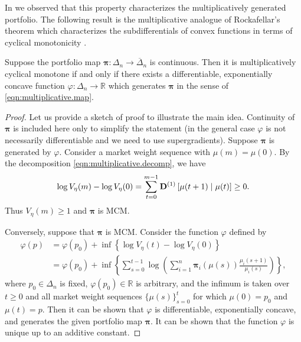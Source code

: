 \documentclass[graybox]{svmult}
\begin{document}
In \cite{PW15} we observed that this property characterizes the multiplicatively generated portfolio. The following result is the multiplicative analogue of Rockafellar's theorem which characterizes the subdifferentials of convex functions in terms of cyclical monotonicity \cite[Section 24]{R70}.

\begin{theorem}
Suppose the portfolio map $\boldsymbol{\pi}: \Delta_n \rightarrow \overline{\Delta}_n$ is continuous. Then it is multiplicatively cyclical monotone if and only if there exists a differentiable, exponentially concave function $\varphi: \Delta_n \rightarrow \mathbb{R}$ which generates $\boldsymbol{\pi}$ in the sense of \eqref{eqn:multiplicative.map}.
\end{theorem}
\begin{proof}
Let us provide a sketch of proof to illustrate the main idea. Continuity of $\boldsymbol{\pi}$ is included here only to simplify the statement (in the general case $\varphi$ is not necessarily differentiable and we need to use supergradients). Suppose $\boldsymbol{\pi}$ is generated by $\varphi$. Consider a market weight sequence with $\mu(m) = \mu(0)$. By the decomposition \eqref{eqn:multiplicative.decomp}, we have
\[
\log V_{\eta}(m) - \log V_{\eta}(0) = \sum_{t = 0}^{m - 1} {\bf D}^{(1)} \left[ \mu(t + 1) \mid \mu(t)\right] \geq 0.
\]
Thus $V_{\eta}(m) \geq 1$ and $\boldsymbol{\pi}$ is MCM.

Conversely, suppose that $\boldsymbol{\pi}$ is MCM. Consider the function $\varphi$ defined by
\begin{equation*}
\begin{split}
\varphi(p) &= \varphi(p_0) + \inf\left\{ \log V_{\eta}(t) - \log V_{\eta}(0)\right\} \\
  &= \varphi(p_0) + \inf \left\{ \sum_{s = 0}^{t-1} \log \left( \sum_{i = 1}^n \boldsymbol{\pi}_i(\mu(s))  \frac{\mu_i(s + 1)}{\mu_i(s)}\right) \right\},
\end{split}
\end{equation*}
where $p_0 \in \Delta_n$ is fixed, $\varphi(p_0) \in \mathbb{R}$ is arbitrary, and the infimum is taken over $t \geq 0$ and all market weight sequences $\{\mu(s)\}_{s = 0}^t$ for which $\mu(0) = p_0$ and $\mu(t) = p$. Then it can be shown that $\varphi$ is differentiable, exponentially concave, and generates the given portfolio map $\boldsymbol{\pi}$. It can be shown that the function $\varphi$ is unique up to an additive constant.
\end{proof}
\end{document}
